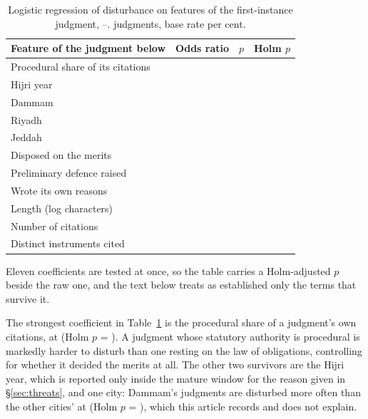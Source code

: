 \documentclass[11pt]{article}
\begin{document}
\begin{table}[t]
\centering
\caption{Logistic regression of disturbance on features of the first-instance
judgment, \nWindowFrom{}--\nWindowTo{}. \nModelN{} judgments, base rate
\nModelBase{} per cent.}
\label{tab:model}
\begin{tabular}{lrrr}
\toprule
Feature of the judgment below & Odds ratio & $p$ & Holm $p$ \\
\midrule
Procedural share of its citations & \nOrProcedural{} & \nPProcedural{} & \nHolmProcedural{} \\
Hijri year                        & \nOrYear{}       & \nPYear{}       & \nHolmYear{} \\
Dammam                            & \nOrDammam{}     & \nPDammam{}     & \nHolmDammam{} \\
Riyadh                            & \nOrRiyadh{}     & \nPRiyadh{}     & \nHolmRiyadh{} \\
Jeddah                            & \nOrJeddah{}     & \nPJeddah{}     & \nHolmJeddah{} \\
Disposed on the merits            & \nOrMerits{}     & \nPMerits{}     & \nHolmMerits{} \\
Preliminary defence raised        & \nOrDefence{}    & \nPDefence{}    & \nHolmDefence{} \\
Wrote its own reasons             & \nOrReasons{}    & \nPReasons{}    & \nHolmReasons{} \\
Length (log characters)           & \nOrLength{}     & \nPLength{}     & \nHolmLength{} \\
Number of citations               & \nOrCitations{}  & \nPCitations{}  & \nHolmCitations{} \\
Distinct instruments cited        & \nOrInstruments{} & \nPInstruments{} & \nHolmInstruments{} \\
\bottomrule
\end{tabular}
\end{table}

Eleven coefficients are tested at once, so the table carries a Holm-adjusted
$p$ beside the raw one, and the text below treats as established only the
\nHolmSurvivors{} terms that survive it.

The strongest coefficient in Table~\ref{tab:model} is the procedural share of
a judgment's own citations, at \nOrProcedural{} (Holm $p$ =
\nHolmProcedural{}). A judgment whose statutory authority is procedural is
markedly harder to disturb than one resting on the law of obligations,
controlling for whether it decided the merits at all. The other two survivors
are the Hijri year, which is reported only inside the mature window for the
reason given in §\ref{sec:threats}, and one city: Dammam's judgments are
disturbed more often than the other cities' at \nOrDammam{} (Holm $p$ =
\nHolmDammam{}), which this article records and does not explain.
\end{document}
